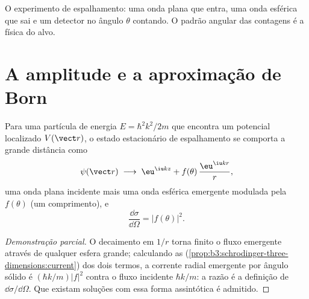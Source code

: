 \begin{omfigure}

{\small O experimento de espalhamento: uma onda plana que entra, uma
onda esférica que sai e um detector no ângulo $\theta$ contando. O
padrão angular das contagens é a física do alvo.}
\end{omfigure}

\section{A amplitude e a aproximação de Born}

\begin{theorem}\label{thm:b3:scattering-theory:amplitude}
Para uma partícula de energia $E = \hbar^2k^2/2m$ que encontra um
potencial localizado $V(\vect r)$, o estado estacionário de
espalhamento se comporta a grande distância como
\[
\psi(\vect r) \;\longrightarrow\;
\eu^{\iu kz} + f(\theta)\,\frac{\eu^{\iu kr}}{r} ,
\]
uma onda plana incidente mais uma onda esférica emergente modulada pela
\emph{} $f(\theta)$ (um comprimento), e
\[
\frac{\dd\sigma}{\dd\Omega} = |f(\theta)|^2 .
\]
\end{theorem}

\begin{proof}[Demonstração parcial]
O decaimento em $1/r$ torna finito o fluxo emergente através de
qualquer esfera grande; calculando as 
(\cref{prop:b3:schrodinger-three-dimensions:current}) dos dois termos,
a corrente radial emergente por ângulo sólido é
$(\hbar k/m)|f|^2$ contra o fluxo incidente $\hbar k/m$: a razão é a
definição de $\dd\sigma/\dd\Omega$. Que existam soluções com essa forma
assintótica é admitido.
\end{proof}

